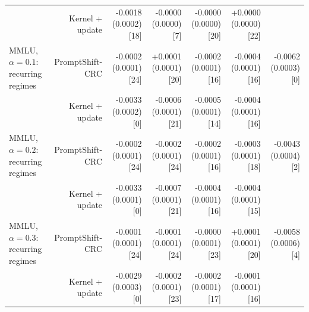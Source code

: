 \begin{table}[H]
{\begin{tabular}{lrrrrrr}
 & Kernel + update & -0.0018 (0.0002) [18] & -0.0000 (0.0000) [7] & -0.0000 (0.0000) [20] & +0.0000 (0.0000) [22] &  \\
MMLU, $\alpha=0.1$: recurring regimes & PromptShift-CRC & -0.0002 (0.0001) [24] & +0.0001 (0.0001) [20] & -0.0002 (0.0001) [16] & -0.0004 (0.0001) [16] & -0.0062 (0.0003) [0] \\
 & Kernel + update & -0.0033 (0.0002) [0] & -0.0006 (0.0001) [21] & -0.0005 (0.0001) [14] & -0.0004 (0.0001) [16] &  \\
MMLU, $\alpha=0.2$: recurring regimes & PromptShift-CRC & -0.0002 (0.0001) [24] & -0.0002 (0.0001) [24] & -0.0002 (0.0001) [16] & -0.0003 (0.0001) [18] & -0.0043 (0.0004) [2] \\
 & Kernel + update & -0.0033 (0.0001) [0] & -0.0007 (0.0001) [21] & -0.0004 (0.0001) [16] & -0.0004 (0.0001) [15] &  \\
MMLU, $\alpha=0.3$: recurring regimes & PromptShift-CRC & -0.0001 (0.0001) [24] & -0.0001 (0.0001) [24] & -0.0000 (0.0001) [23] & +0.0001 (0.0001) [20] & -0.0058 (0.0006) [4] \\
 & Kernel + update & -0.0029 (0.0003) [0] & -0.0002 (0.0001) [23] & -0.0002 (0.0001) [17] & -0.0001 (0.0001) [16] &  \\
\bottomrule
\end{tabular}
}
\end{table}


